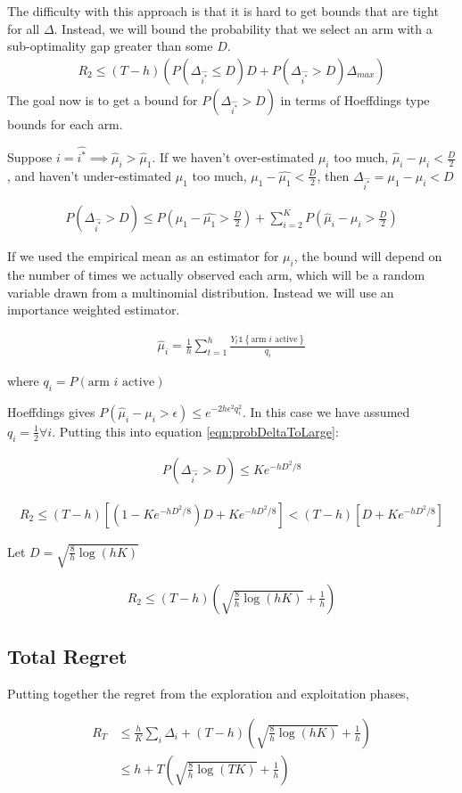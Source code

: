 \documentclass{article}
\newcommand{\set}[1]{\left\{#1\right\}}
\newcommand{\ind}[1]{\mathds{1}\!\!\set{#1}}
\newcommand{\eqn}[1]{\begin{align}#1\end{align}}
\theoremstyle{plain}
\theoremstyle{definition}
\begin{document}
The difficulty with this approach is that it is hard to get bounds that are tight for all $\Delta$. Instead, we will bound the probability that we select an arm with a sub-optimality gap greater than some $D$.
\eqn{
R_2 \leq (T-h)\left(P(\Delta_{\hat{i^*}} \leq D) D+P(\Delta_{\hat{i^*}} > D)  \Delta_{max} \right)
}
The goal now is to get a bound for $P(\Delta_{\hat{i^*}} > D)$ in terms of Hoeffdings type bounds for each arm. 

Suppose $i = \hat{i^*} \implies \hat{\mu}_i > \hat{\mu}_1$. If we haven't over-estimated $\mu_i$ too much, $\hat{\mu}_i - \mu_{i} < \frac{D}{2}$, and haven't under-estimated $\mu_1$ too much, $\mu_1 - \hat{\mu_1} < \frac{D}{2}$, then $\Delta_{\hat{i^*}} = \mu_1 - \mu_i < D$

\eqn{
\label{eqn:probDeltaToLarge}
P(\Delta_{\hat{i^*}} > D) \leq  P(\mu_1 - \hat{\mu_1} > \frac{D}{2})+ \sum_{i=2}^K P(\hat{\mu}_i - \mu_{i} > \frac{D}{2})
}

If we used the empirical mean as an estimator for $\mu_i$, the bound will depend on the number of times we actually observed each arm, which will be a random variable drawn from a multinomial distribution. Instead we will use an importance weighted estimator.

\eqn{
\label{eqn:importance_weighted_estimator}
\hat{\mu}_i = \frac{1}{h}\sum_{t=1}^h \frac{Y_t\ind{\text{arm $i$ active}}}{q_i}
}

where $q_i = P(\text{arm $i$ active})$

Hoeffdings gives $ P(\hat{\mu}_i - \mu_{i} > \epsilon) \leq e^{-2h\epsilon^2q_i^2}$. In this case we have assumed $q_i = \frac{1}{2} \forall i$. Putting this into equation \ref{eqn:probDeltaToLarge}:

\eqn{
\label{eqn:balancedHoeffdings}
P(\Delta_{\hat{i^*}} > D) \leq Ke^{-hD^2/8}
}


\eqn{
R_2 \leq (T-h)[(1-K e^{-hD^2/8})D + K e^{-hD^2/8}] < (T-h)[D + K e^{-hD^2/8}]
}

Let $D = \sqrt{\frac{8}{h}\log(hK)}$ 

\eqn{
R_2 \leq (T-h)\left(\sqrt{\frac{8}{h}\log(hK)} + \frac{1}{h}\right)
}


\subsection*{Total Regret}

Putting together the regret from the exploration and exploitation phases,

\eqn{
R_T & \leq \frac{h}{K}\sum_i \Delta_i + (T-h)\left(\sqrt{\frac{8}{h}\log(hK)} + \frac{1}{h}\right)\\
& \leq h + T\left(\sqrt{\frac{8}{h}\log(TK)} + \frac{1}{h}\right)
}
\end{document}
